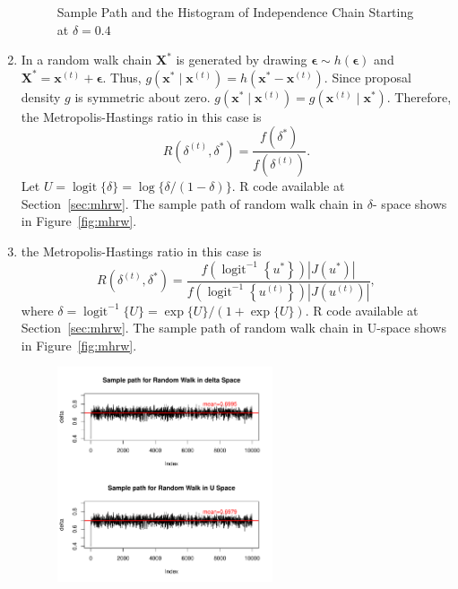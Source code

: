 \documentclass[11pt]{article}
\begin{document}
\begin{enumerate}
\begin{figure}[!hbt]
\begin{center}
        \end{center}
        \caption{Sample Path and the Histogram of Independence Chain Starting at $\delta=0.4$}
        \label{fig:mhic}
    \end{figure}
    \item In a random walk chain $\mathbf{X}^{*}$ is generated by drawing $\boldsymbol{\epsilon} \sim h(\boldsymbol{\epsilon})$  and $\mathbf{X}^{*}=\mathbf{x}^{(t)}+\boldsymbol{\epsilon}.$ Thus, $g\left(\mathbf{x}^{*} \mid \mathbf{x}^{(t)}\right)=h\left(\mathbf{x}^{*}-\mathbf{x}^{(t)}\right) .$ Since proposal density $g$ is symmetric about zero. $g\left(\mathbf{x}^{*} \mid \mathbf{x}^{(t)}\right)=g\left(\mathbf{x}^{(t)} \mid \mathbf{x}^{*}\right)$. Therefore, the Metropolis-Hastings ratio in this case is $$R(\delta^{(t)},\delta^{*})=\frac{f\left(\delta^{*}\right)}{f\left(\delta^{(t)}\right) }.$$Let $U=\operatorname{logit}\{\delta\}=\log \{\delta /(1-\delta)\}$. R code available at Section~\ref{sec:mhrw}. The sample path of random walk chain in $\delta$- space shows in Figure~\ref{fig:mhrw}.
    \item the Metropolis-Hastings ratio in this case is $$R(\delta^{(t)},\delta^{*})=\frac{f\left(\operatorname{logit}^{-1}\left\{u^{*}\right\}\right)\left|J\left(u^{*}\right)\right|}{f\left(\operatorname{logit}^{-1}\left\{u^{(t)}\right\}\right)\left|J\left(u^{(t)}\right)\right|},$$where $\delta=\operatorname{logit}^{-1}\{U\}=\exp \{U\} /(1+\exp \{U\})$. R code available at Section~\ref{sec:mhrw}. The sample path of random walk chain in U-space shows in Figure~\ref{fig:mhrw}.
    \begin{figure}[htbp]
        \begin{center}
            \includegraphics[width=0.6\textwidth]{img/mhrw-1.pdf}
        \end{center}

\end{figure}
\end{enumerate}
\end{document}
